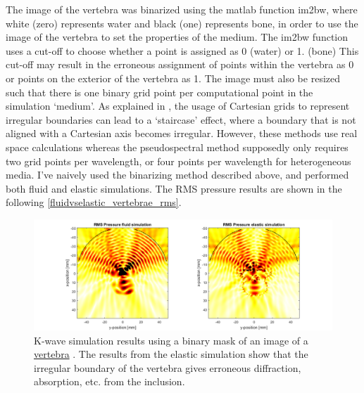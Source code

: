 \documentclass[10pt,a4paper]{article}
\begin{document}
The image of the vertebra was binarized using the matlab function im2bw, where white (zero) represents water and black (one) represents bone, in order to use the image of the vertebra to set the properties of the medium. The im2bw function uses a cut-off to choose whether a point is assigned as 0 (water) or 1. (bone) This cut-off may result in the erroneous assignment of points within the vertebra as 0 or points on the exterior of the vertebra as 1. The image must also be resized such that there is one binary grid point per computational point in the simulation `medium'. As explained in \cite{muir1992modeling,vafaeian2014finite}, the usage of Cartesian grids to represent irregular boundaries can lead to a `staircase' effect, where a boundary that is not aligned with a Cartesian axis becomes irregular. However, these methods use real space calculations whereas the pseudospectral method supposedly only requires two grid points per wavelength, or four points per wavelength for heterogeneous media. I've naively used the binarizing method described above, and performed both fluid and elastic simulations. The RMS pressure results are shown in the following \autoref{fluidvselastic_vertebrae_rms}.

\begin{figure}[H]
\hspace*{-4cm}
\includegraphics[scale=0.7]{fluidvselastic_vertebrae_rms}
\caption{K-wave simulation results using a binary mask of an image of a \href{https://www.cedars-sinai.edu/Patients/Programs-and-Services/Spine-Center/The-Patient-Guide/Anatomy-of-the-Spine/Vertebrae-of-the-Spine.aspx}{vertebra} . The results from the elastic simulation show that the irregular boundary of the vertebra gives erroneous diffraction, absorption, etc. from the inclusion.}\label{fluidvselastic_vertebrae_rms}
\end{figure} 
\end{document}
